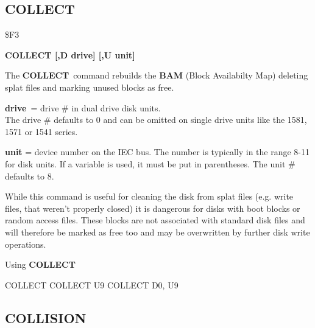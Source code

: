\subsection{COLLECT}
\begin{description}[leftmargin=3cm,style=nextline]
\item [Token:] \$F3
\item [Format:] {\bf COLLECT [,D drive] [,U unit] }
\item [Usage:]
   The {\bf COLLECT} command rebuilds the {\bf BAM}
   (Block Availabilty Map) deleting splat files and marking
   unused blocks as free.

   {\bf drive} = drive \# in dual drive disk units. \\
   The drive \# defaults to 0 and can be omitted on single drive units
   like the 1581, 1571 or 1541 series.

   {\bf unit} = device number on the IEC bus.
   The number is typically in the range 8-11 for disk units.
   If a variable is used, it must be put in parentheses.
   The unit \# defaults to 8.

\item [Remarks:]
   While this command is useful for cleaning the disk from
   splat files (e.g. write files, that weren't properly closed)
   it is dangerous for disks with boot blocks or random access files.
   These blocks are not associated with standard disk files
   and will therefore be marked as free too and may be overwritten
   by further disk write operations.

\item [Example:] Using {\bf COLLECT}
\begin{screenoutput}
  COLLECT
  COLLECT U9
  COLLECT D0, U9
\end{screenoutput}
\end{description}


\newpage
\subsection{COLLISION}

